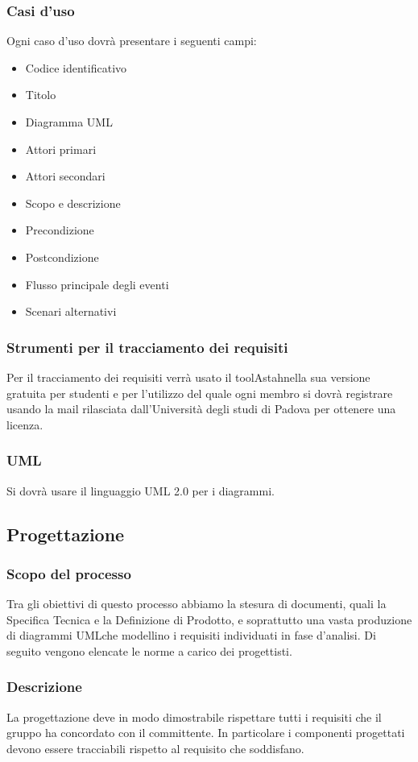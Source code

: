 \documentclass[a4paper,11pt]{article}
\begin{document}
			\subsubsection{Casi d'uso}
			Ogni caso d'uso dovrà presentare i seguenti campi:
			\begin{itemize}
			\item Codice identificativo
			\item Titolo
			\item Diagramma UML\addglos
			\item Attori primari
			\item Attori secondari
			\item Scopo e descrizione
			\item Precondizione
			\item Postcondizione
			\item Flusso principale degli eventi
			\item Scenari alternativi
			\end{itemize}
	
			\subsubsection{Strumenti per il tracciamento dei requisiti}
			Per il tracciamento dei requisiti verrà usato il tool\addglos Astah\addglos nella sua versione gratuita per studenti e per l'utilizzo del quale ogni membro si dovrà registrare usando la mail rilasciata dall'Università degli studi di Padova per ottenere una licenza.  
			\subsubsection{UML}
			Si dovrà usare il linguaggio UML 2.0 per i diagrammi.
		\subsection{Progettazione}
			\subsubsection{Scopo del processo}
			Tra gli obiettivi di questo processo abbiamo la stesura di documenti, quali la Specifica Tecnica e la Definizione di Prodotto, e soprattutto una vasta produzione di diagrammi UML\addglos che modellino i requisiti individuati in fase d'analisi. Di seguito vengono elencate le norme a carico dei progettisti.
			\subsubsection{Descrizione}
			La progettazione deve in modo dimostrabile rispettare tutti i requisiti che il gruppo ha concordato con il committente. In particolare i componenti progettati devono essere tracciabili rispetto al requisito che soddisfano.
\end{document}
